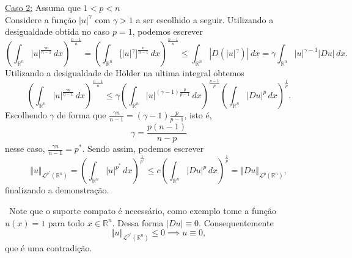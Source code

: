\documentclass[a4paper, 11pt]{book}
\theoremstyle{definition}
\newcommand{\obs}{\noindent{\textbf{\textcolor{black}{\sffamily Observação:}}}~}
\newcommand{\bR}{\mathbb{R}}
\newcommand{\cL}{\mathcal{L}}
\begin{document}
\begin{prf}
    \underline{Caso 2:} Assuma que $1 < p < n$\\
    Considere a função $|u|^\gamma$ com $\gamma > 1$ a ser escolhido a seguir. Utilizando a desigualdade obtida no caso $p = 1$, podemos escrever
    \[
        \left( \int_{\bR^n} |u|^{\frac{\gamma n}{n - 1}}  \, dx\right)^{\frac{n-1}{n}} = \left( \int_{\bR^n} \Big[ |u|^\gamma \Big]^{\frac{n}{n-1}} \,dx \right)^{\frac{n-1}{n}} \leqslant \int_{\bR^n} |D(|u|^{\gamma})| \,dx = \gamma \int_{\bR^n} |u|^{\gamma-1} |Du| \,dx.
    \]
    Utilizando a desigualdade de Hölder na ultima integral obtemos
    \[
        \left( \int_{\bR^n} |u|^{\frac{\gamma n}{n - 1}}  \, dx\right)^{\frac{n-1}{n}} \leqslant \gamma\left( \int_{\bR^n} |u|^{(\gamma-1)\frac{p}{p-1}} \,dx \right)^{\frac{p-1}{p}} \left( \int_{\bR^n} |Du|^p \,dx \right)^{\frac{1}{p}}.
    \]
    Escolhendo $\gamma$ de forma que $\displaystyle\frac{\gamma n}{n - 1} = (\gamma -1)\frac{p}{p-1}$, isto é,
    \[
        \gamma = \frac{p(n-1)}{n-p}
    \]
    nesse caso, $\displaystyle\frac{\gamma n}{n-1} = p^*$. Sendo assim, podemos escrever
    \[
        \Vert u \Vert_{\cL^{p^*}(\bR^n)} = \left( \int_{\bR^n} |u|^{p^*} \,dx \right)^{\frac{1}{p^*}} \leqslant c \left( \int_{\bR^n} |Du|^p \,dx\right)^{\frac{1}{p}} = \Vert Du \Vert_{\cL^p(\bR^n)},
    \]
    finalizando a demonstração.
\end{prf}

\obs Note que o suporte compato é necessário, como exemplo tome a função $u(x) = 1$ para todo $x \in \bR^n$. Dessa forma $|Du| \equiv 0$. Consequentemente
\[
    \Vert u \Vert_{\cL^{p^*}(\bR^n)} \leqslant 0 \implies u \equiv 0,
\]
que é uma contradição.
\end{document}
